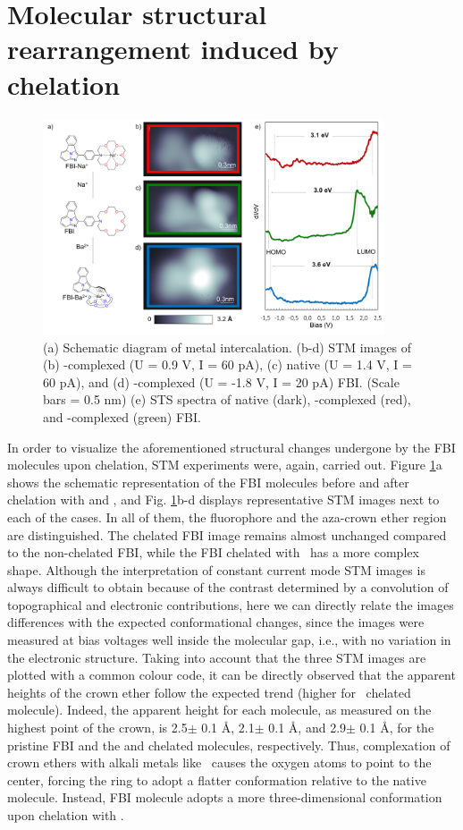 \documentclass[aps,prl,reprint,longbibliography,superscriptaddress, english]{revtex4-1}
\begin{document}
\section{Molecular structural rearrangement induced by chelation}

\begin{figure}[ht!]
	\includegraphics[width=0.9\textwidth]{figures/Figure_4.png}
	\caption{\label{Fig_STS} 
    (a) Schematic diagram of metal intercalation. (b-d) STM images of (b) \Nap-complexed (U = 0.9 V, I = 60 pA), (c) native (U = 1.4 V, I = 60 pA), and (d) \Bapp-complexed (U = -1.8 V, I = 20 pA) FBI. (Scale bars = 0.5 nm) (e) STS spectra of native (dark), \Nap-complexed (red), and \Bapp-complexed (green) FBI.}
\end{figure}

In order to visualize the aforementioned structural changes undergone by the FBI molecules upon chelation, 
 STM experiments were, again, carried out. Figure \ref{Fig_STS}a shows the schematic representation of the FBI molecules before and after chelation with \Nap and \Bapp, and Fig. \ref{Fig_STS}b-d displays representative STM images next to each of the cases. In all of them, the fluorophore and the aza-crown ether region are distinguished. The \Nap chelated FBI image remains almost unchanged compared to the non-chelated FBI, while the FBI chelated with \Bapp\ has a more complex shape. Although the interpretation of constant current mode STM images is always difficult to obtain because of the contrast determined by a convolution of topographical and electronic contributions, here we can directly relate the images differences with the expected conformational changes, since the images were measured at bias voltages well inside the molecular gap, i.e., with no variation in the electronic structure. Taking into account that the three STM images are plotted with a common colour code, it can be directly observed that the apparent heights of the crown ether follow the expected trend (higher for \Bapp\ chelated molecule). Indeed, the apparent height for each molecule, as measured on the highest point of the crown, is 2.5$\pm$ 0.1 \AA, 2.1$\pm$ 0.1 \AA, and 2.9$\pm$ 0.1 \AA, for the pristine FBI and the \Nap and \Bapp chelated molecules, respectively. Thus, complexation of crown ethers with alkali metals like \Nap\ causes the oxygen atoms to point to the center, forcing the ring to adopt a flatter conformation relative to the native molecule. Instead, FBI molecule adopts a more three-dimensional conformation upon chelation with \Bapp.  
 
\end{document}
